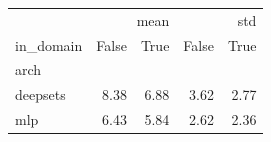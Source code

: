 \begin{tabular}{lrrrr}
\toprule
 & \multicolumn{2}{r}{mean} & \multicolumn{2}{r}{std} \\
in_domain & False & True & False & True \\
arch &  &  &  &  \\
\midrule
deepsets & 8.38 & 6.88 & 3.62 & 2.77 \\
mlp & 6.43 & 5.84 & 2.62 & 2.36 \\
\bottomrule
\end{tabular}
